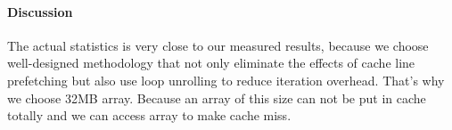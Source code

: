 \paragraph{Discussion}
The actual statistics is very close to our measured results, because we choose well-designed methodology that not only eliminate the effects of cache line prefetching but also use loop unrolling to reduce iteration overhead. That's why we choose 32MB array. Because an array of this size can not be put in cache totally and we can access array to make cache miss.